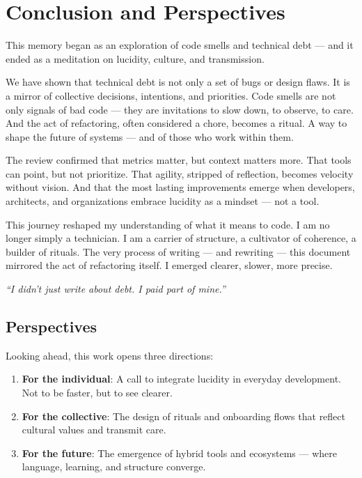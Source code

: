 
\section{Conclusion and Perspectives}

This memory began as an exploration of code smells and technical debt — and it ended as a meditation on lucidity, culture, and transmission.

We have shown that technical debt is not only a set of bugs or design flaws. It is a mirror of collective decisions, intentions, and priorities. Code smells are not only signals of bad code — they are invitations to slow down, to observe, to care. And the act of refactoring, often considered a chore, becomes a ritual. A way to shape the future of systems — and of those who work within them.

The review confirmed that metrics matter, but context matters more. That tools can point, but not prioritize. That agility, stripped of reflection, becomes velocity without vision. And that the most lasting improvements emerge when developers, architects, and organizations embrace lucidity as a mindset — not a tool.

This journey reshaped my understanding of what it means to code. I am no longer simply a technician. I am a carrier of structure, a cultivator of coherence, a builder of rituals. The very process of writing — and rewriting — this document mirrored the act of refactoring itself. I emerged clearer, slower, more precise.

\textit{“I didn't just write about debt. I paid part of mine.”}

\subsection*{Perspectives}

Looking ahead, this work opens three directions:

\begin{enumerate}
    \item \textbf{For the individual}: A call to integrate lucidity in everyday development. Not to be faster, but to see clearer.
    \item \textbf{For the collective}: The design of rituals and onboarding flows that reflect cultural values and transmit care.
    \item \textbf{For the future}: The emergence of hybrid tools and ecosystems — where language, learning, and structure converge.
\end{enumerate}

